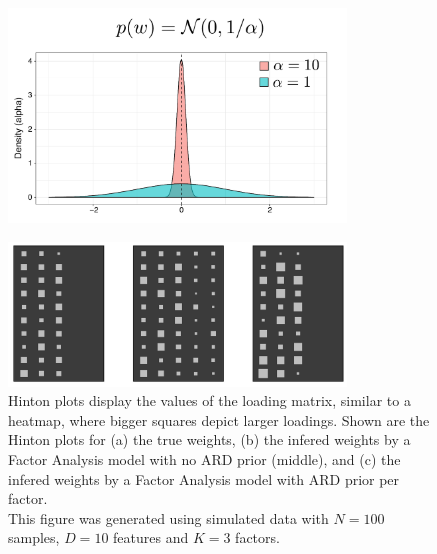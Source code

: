 \begin{figure}[H] \begin{center}
	\includegraphics[width=0.8\textwidth]{Chapter2/Figs/ard}
	\caption{}
	\label{fig:ard}
\end{center} \end{figure}

\begin{figure}[H] \begin{center}
	\includegraphics[width=0.8\textwidth]{Chapter2/Figs/hinton}
            \caption[Hinton plot of the loading matrix for a bayesian Factor Analysis model with an ARD prior]{Hinton plots display the values of the loading matrix, similar to a heatmap, where bigger squares depict larger loadings. Shown are the Hinton plots for (a) the true weights, (b) the infered weights by a Factor Analysis model with no ARD prior (middle), and (c) the infered weights by a Factor Analysis model with ARD prior per factor.\\
            This figure was generated using simulated data with $N=100$ samples, $D=10$ features and $K=3$ factors.}
	\label{fig:hinton}
\end{center} \end{figure}

